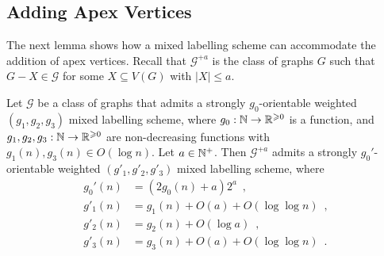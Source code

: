 \documentclass{patmorin}
\renewcommand{\ge}{\geqslant}
\renewcommand{\leq}{\leqslant}
\newcommand{\Oh}{O}
\newcommand{\calG}{\mathcal{G}}
\begin{document}
\subsection{Adding Apex Vertices}
\label{sec:adding_apexes}

The next lemma shows how a mixed labelling scheme can accommodate the addition of apex vertices. Recall that $\calG^{+a}$ is the class of graphs $G$ such that $G-X\in\calG$ for some $X\subseteq V(G)$ with $|X|\leq a$.

\begin{lem}\label{add_apexes}
  Let $\calG$ be a class of graphs that admits a strongly $g_0$-orientable weighted $(g_1,g_2,g_3)$ mixed labelling scheme, where $g_0:\N\to\R^{\ge 0}$ is a function, and $g_1,g_2,g_3:\N\to\R^{\ge 0}$ are non-decreasing functions with $g_1(n),g_3(n)\in \Oh(\log n)$.
  Let $a\in\mathbb{N}^+$. Then $\calG^{+a}$ admits a strongly $g_0'$-orientable weighted $(g'_1,g'_2,g'_3)$ mixed labelling scheme, where
  \begin{align*}
    g_0'(n)
     & = (2g_0(n) + a)2^{a} \enspace,  \\
    g'_1(n)
     & = g_1(n)+\Oh(a)+\Oh(\log\log n) \enspace,  \\
    g'_2(n)
     & = g_2(n)+\Oh(\log a) \enspace,             \\
    g'_3(n)
     & = g_3(n)+\Oh(a)+\Oh(\log\log n) \enspace .
  \end{align*}
\end{lem}
\end{document}
